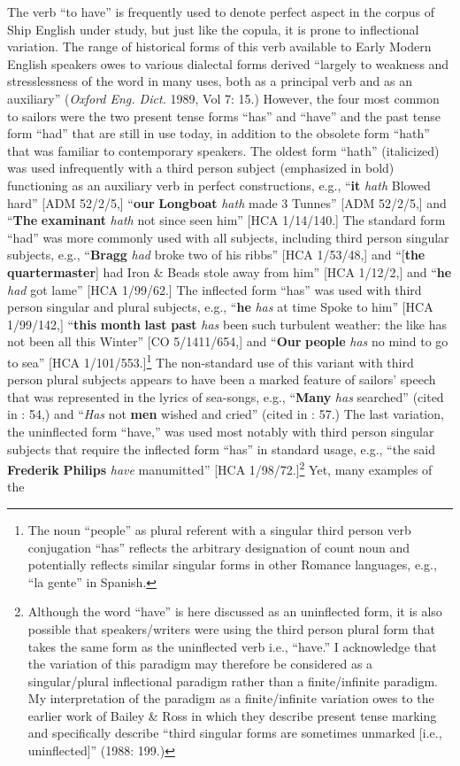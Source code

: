   The verb “to have” is frequently used to denote perfect aspect in the corpus of Ship English under study, but just like the copula, it is prone to inflectional variation.  The range of historical forms of this verb available to Early Modern English speakers owes to various dialectal forms derived “largely to weakness and stresslessness of the word in many uses, both as a principal verb and as an auxiliary” (\textit{Oxford Eng. Dict.} 1989, Vol 7: 15.) However, the four most common to sailors were the two present tense forms “has” and “have” and the past tense form “had” that are still in use today, in addition to the obsolete form “hath” that was familiar to contemporary speakers. The oldest form “hath” (italicized) was used infrequently with a third person subject (emphasized in bold) functioning as an auxiliary verb in perfect constructions, e.g., “\textbf{it} \textit{hath} Blowed hard” [ADM 52/2/5,] “\textbf{our} \textbf{Longboat} \textit{hath} made 3 Tunnes” [ADM 52/2/5,] and “\textbf{The} \textbf{examinant} \textit{hath} not since seen him” [HCA 1/14/140.] The standard form “had” was more commonly used with all subjects, including third person singular subjects, e.g., “\textbf{Bragg} \textit{had} broke two of his ribbs” [HCA 1/53/48,] and “[\textbf{the} \textbf{quartermaster}] had Iron \& Beads stole away from him” [HCA 1/12/2,] and “\textbf{he} \textit{had} got lame” [HCA 1/99/62.] The inflected form “has” was used with third person singular and plural subjects, e.g., “\textbf{he} \textit{has} at time Spoke to him” [HCA 1/99/142,] “\textbf{this} \textbf{month} \textbf{last} \textbf{past} \textit{has} been such turbulent weather: the like has not been all this Winter” [CO 5/1411/654,] and “\textbf{Our} \textbf{people} \textit{has} no mind to go to sea” [HCA 1/101/553.]\footnote{The noun “people” as plural referent with a singular third person verb conjugation “has” reflects the arbitrary designation of count noun and potentially reflects similar singular forms in other Romance languages, e.g., “la gente” in Spanish.} The non-standard use of this variant with third person plural subjects appears to have been a marked feature of sailors’ speech that was represented in the lyrics of sea-songs, e.g., “\textbf{Many} \textit{has} searched” (cited in \citealt{Palmer1986}: 54,) and “\textit{Has} not \textbf{men} wished and cried” (cited in \citealt{Palmer1986}: 57.) The last variation, the uninflected form “have,” was used most notably with third person singular subjects that require the inflected form “has” in standard usage, e.g., “the said \textbf{Frederik} \textbf{Philips} \textit{have} manumitted” [HCA 1/98/72.]\footnote{Although the word “have” is here discussed as an uninflected form, it is also possible that speakers/writers were using the third person plural form that takes the same form as the uninflected verb i.e., “have.” I acknowledge that the variation of this paradigm may therefore be considered as a singular/plural inflectional paradigm rather than a finite/infinite paradigm. My interpretation of the paradigm as a finite/infinite variation owes to the earlier work of Bailey \& Ross in which they describe present tense marking and specifically describe “third singular forms are sometimes unmarked [i.e., uninflected]” (1988: 199.)} Yet, many examples of the 